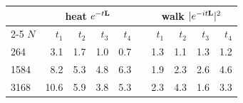 \begin{tabular}{@{}lrrrrcrrrr@{}}
\toprule
& \multicolumn{4}{c}{heat $e^{-t\mathbf{L}}$} & & \multicolumn{4}{c}{walk $|e^{-it\mathbf{L}}|^{2}$} \\
\cmidrule{2-5}\cmidrule{7-10}
$N$ & $t_1$ & $t_2$ & $t_3$ & $t_4$ & & $t_1$ & $t_2$ & $t_3$ & $t_4$ \\
\midrule
264 & 3.1 & 1.7 & 1.0 & 0.7 & & 1.3 & 1.1 & 1.3 & 1.2 \\
1584 & 8.2 & 5.3 & 4.8 & 6.3 & & 1.9 & 2.3 & 2.6 & 4.6 \\
3168 & 10.6 & 5.9 & 3.8 & 5.3 & & 2.3 & 4.3 & 1.6 & 3.3 \\
\bottomrule
\end{tabular}
